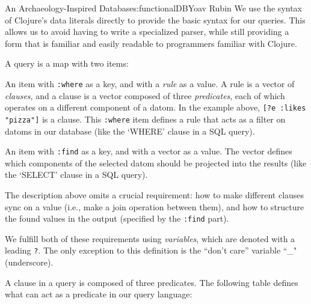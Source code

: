 \begin{aosachapter}{An Archaeology-Inspired Database}{s:functionalDB}{Yoav Rubin}
We use the syntax of Clojure's data literals directly to provide the
basic syntax for our queries. This allows us to avoid having to write a
specialized parser, while still providing a form that is familiar and
easily readable to programmers familiar with Clojure.

A query is a map with two items:

\begin{aosaitemize}

\item
  An item with \texttt{:where} as a key, and with a \emph{rule} as a
  value. A rule is a vector of \emph{clauses}, and a clause is a vector
  composed of three \emph{predicates}, each of which operates on a
  different component of a datom. In the example above,
  \texttt{{[}?e  :likes "pizza"{]}} is a clause. This \texttt{:where}
  item defines a rule that acts as a filter on datoms in our database
  (like the `WHERE' clause in a SQL query).
\item
  An item with \texttt{:find} as a key, and with a vector as a value.
  The vector defines which components of the selected datom should be
  projected into the results (like the `SELECT' clause in a SQL query).
\end{aosaitemize}

The description above omits a crucial requirement: how to make different
clauses sync on a value (i.e., make a join operation between them), and
how to structure the found values in the output (specified by the
\texttt{:find} part).

We fulfill both of these requirements using \emph{variables}, which are
denoted with a leading \texttt{?}. The only exception to this definition
is the ``don't care'' variable ``\_" (underscore).

A clause in a query is composed of three predicates. The following table
defines what can act as a predicate in our query language:


\end{aosachapter}
